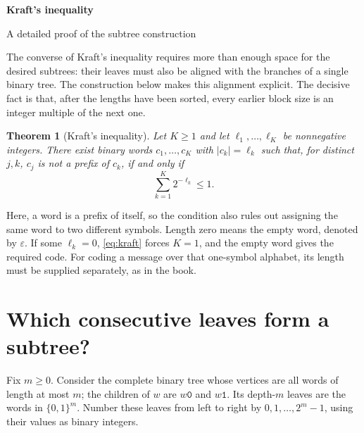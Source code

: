 \documentclass[11pt]{article}
\newtheorem{theorem}{Theorem}
\newcommand{\bits}{\{0,1\}}
\newcommand{\word}[1]{\texttt{#1}}
\begin{document}
\thispagestyle{empty}
{\sffamily\color{ink}\setlength{\parskip}{0pt}
 {\small\BookTitle\par}
 \vspace{4mm}
 {\LARGE\bfseries Kraft's inequality\par}
 \vspace{2mm}
 {\large A detailed proof of the subtree construction\par}
 \vspace{4mm}
 {\BookAuthor\hfill\small\color{muted}\BookEditionDate\par}
 {\small\color{muted}\BookAffiliation\par}
 \vspace{3mm}{\color{accent}\rule{\linewidth}{.8pt}}\par}

The converse of Kraft's inequality requires more than enough space for the
desired subtrees: their leaves must also be aligned with the branches of a
single binary tree. The construction below makes this alignment explicit.
The decisive fact is that, after the lengths have been sorted, every earlier
block size is an integer multiple of the next one.

\begin{theorem}[Kraft's inequality]
Let $K\geq1$ and let $\ell_1,\ldots,\ell_K$ be nonnegative integers.
There exist binary words $c_1,\ldots,c_K$ with $|c_k|=\ell_k$ such that,
for distinct $j,k$, $c_j$ is not a prefix of $c_k$, if and only if
\begin{equation}\label{eq:kraft}
    \sum_{k=1}^K 2^{-\ell_k}\leq1.
\end{equation}
\end{theorem}

Here, a word is a prefix of itself, so the condition also rules out assigning
the same word to two different symbols. Length zero means the empty word,
denoted by $\varepsilon$. If some $\ell_k=0$, \eqref{eq:kraft} forces $K=1$,
and the empty word gives the required code. For coding a message over that
one-symbol alphabet, its length must be supplied separately, as in the book.

\section*{Which consecutive leaves form a subtree?}

Fix $m\geq0$. Consider the complete binary tree whose vertices are all words
of length at most $m$; the children of $w$ are $w\word{0}$ and $w\word{1}$.
Its depth-$m$ leaves are the words in $\bits^m$. Number these leaves from left
to right by $0,1,\ldots,2^m-1$, using their values as binary integers.
\end{document}
